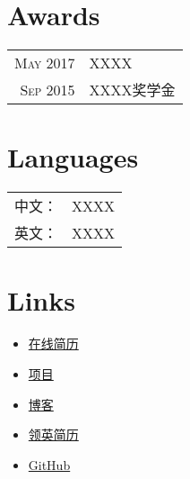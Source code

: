 \documentclass[a4paper,10pt]{article}
\begin{document}
\section{Awards}
\begin{tabular}{rl}
\textsc{May} 2017 & XXXX\\
\textsc{Sep} 2015 & XXXX奖学金
\end{tabular}

\section{Languages}
\begin{tabular}{rl}
 \textsc{中文：}&XXXX\\
\textsc{ 英文：}&XXXX\\
\end{tabular}

\section{Links}
\begin{itemize}
    \item \href{https://your-cv.com}{在线简历}
    \item \href{https://ddlee.cn/projects.html}{项目}
    \item \href{https://blog.ddlee.cn/}{博客}
    \item \href{https://www.linkedin.com/in/your-url/}{领英简历}
    \item \href{https://github.com/ddlee96}{GitHub}
\end{itemize}
\end{document}

